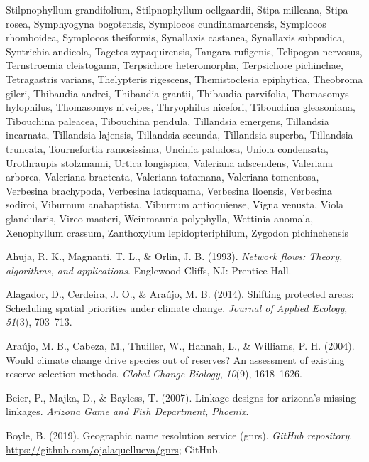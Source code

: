\documentclass[]{article}
\begin{document}
Stilpnophyllum grandifolium, Stilpnophyllum oellgaardii, Stipa milleana, Stipa rosea, Symphyogyna bogotensis, Symplocos cundinamarcensis, Symplocos rhomboidea, Symplocos theiformis, Synallaxis castanea, Synallaxis subpudica, Syntrichia andicola, Tagetes zypaquirensis, Tangara rufigenis, Telipogon nervosus, Ternstroemia cleistogama, Terpsichore heteromorpha, Terpsichore pichinchae, Tetragastris varians, Thelypteris rigescens, Themistoclesia epiphytica, Theobroma gileri, Thibaudia andrei, Thibaudia grantii, Thibaudia parvifolia, Thomasomys hylophilus, Thomasomys niveipes, Thryophilus nicefori, Tibouchina gleasoniana, Tibouchina paleacea, Tibouchina pendula, Tillandsia emergens, Tillandsia incarnata, Tillandsia lajensis, Tillandsia secunda, Tillandsia superba, Tillandsia truncata, Tournefortia ramosissima, Uncinia paludosa, Uniola condensata, Urothraupis stolzmanni, Urtica longispica, Valeriana adscendens, Valeriana arborea, Valeriana bracteata, Valeriana tatamana, Valeriana tomentosa, Verbesina brachypoda, Verbesina latisquama, Verbesina lloensis, Verbesina sodiroi, Viburnum anabaptista, Viburnum antioquiense, Vigna venusta, Viola glandularis, Vireo masteri, Weinmannia polyphylla, Wettinia anomala, Xenophyllum crassum, Zanthoxylum lepidopteriphilum, Zygodon pichinchensis

\hypertarget{refs}{}
\leavevmode\hypertarget{ref-Ahuja93}{}%
Ahuja, R. K., Magnanti, T. L., \& Orlin, J. B. (1993). \emph{Network flows: Theory, algorithms, and applications}. Englewood Cliffs, NJ: Prentice Hall.

\leavevmode\hypertarget{ref-alagador2014shifting}{}%
Alagador, D., Cerdeira, J. O., \& Araújo, M. B. (2014). Shifting protected areas: Scheduling spatial priorities under climate change. \emph{Journal of Applied Ecology}, \emph{51}(3), 703--713.

\leavevmode\hypertarget{ref-araujo2004would}{}%
Araújo, M. B., Cabeza, M., Thuiller, W., Hannah, L., \& Williams, P. H. (2004). Would climate change drive species out of reserves? An assessment of existing reserve-selection methods. \emph{Global Change Biology}, \emph{10}(9), 1618--1626.

\leavevmode\hypertarget{ref-beier2007linkage}{}%
Beier, P., Majka, D., \& Bayless, T. (2007). Linkage designs for arizona's missing linkages. \emph{Arizona Game and Fish Department, Phoenix}.

\leavevmode\hypertarget{ref-Boyle2019GNRS}{}%
Boyle, B. (2019). Geographic name resolution service (gnrs). \emph{GitHub repository}. \url{https://github.com/ojalaquellueva/gnrs}; GitHub.
\end{document}
